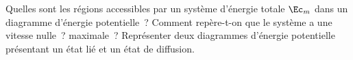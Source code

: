 \documentclass[a4paper, 10pt, final, garamond]{book}
\begin{document}
\begin{enumerate}[label=\sqenumi]
	Quelles sont les régions accessibles par un système d'énergie totale $\Ec_m$
	dans un diagramme d'énergie potentielle~? Comment repère-t-on que le système a
	une vitesse nulle~? maximale~? Représenter deux diagrammes d'énergie
	potentielle présentant un état lié et un état de diffusion.
	\smallbreak
	\begin{isd}[lefthand ratio=.3]
		\begin{itemize}
		\end{itemize}
		\tcblower
		\begin{isd}[sidebyside align=top]
			\begin{center}
			\end{center}
			\tcblower
			\begin{center}

\end{center}
\end{isd}
\end{isd}
\end{enumerate}
\end{document}
